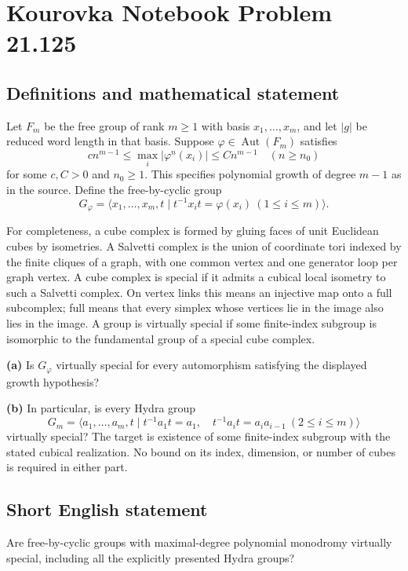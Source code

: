 \documentclass[11pt,a4paper]{article}
\begin{document}
\section*{Kourovka Notebook Problem 21.125}\label{statement}

\subsection{Definitions and mathematical statement}
Let $F_m$ be the free group of rank $m\ge1$ with basis $x_1,\ldots,x_m$, and let $|g|$ be reduced word length in that basis. Suppose $\varphi\in\operatorname{Aut}(F_m)$ satisfies
\[
 c n^{m-1}\le\max_i|\varphi^n(x_i)|\le C n^{m-1}
 \quad(n\ge n_0)
\]
for some $c,C>0$ and $n_0\ge1$. This specifies polynomial growth of degree $m-1$ as in the source. Define the free-by-cyclic group
\[
 G_\varphi=\langle x_1,\ldots,x_m,t\mid
 t^{-1}x_it=\varphi(x_i)\ (1\le i\le m)\rangle.
\]

For completeness, a cube complex is formed by gluing faces of unit Euclidean cubes by isometries. A Salvetti complex is the union of coordinate tori indexed by the finite cliques of a graph, with one common vertex and one generator loop per graph vertex. A cube complex is special if it admits a cubical local isometry to such a Salvetti complex. On vertex links this means an injective map onto a full subcomplex; full means that every simplex whose vertices lie in the image also lies in the image. A group is virtually special if some finite-index subgroup is isomorphic to the fundamental group of a special cube complex.

\textbf{(a)} Is $G_\varphi$ virtually special for every automorphism satisfying the displayed growth hypothesis?

\textbf{(b)} In particular, is every Hydra group
\[
 G_m=\langle a_1,\ldots,a_m,t\mid
 t^{-1}a_1t=a_1,\quad t^{-1}a_it=a_ia_{i-1}\ (2\le i\le m)\rangle
\]
virtually special? The target is existence of some finite-index subgroup with the stated cubical realization. No bound on its index, dimension, or number of cubes is required in either part.
\subsection{Short English statement}
Are free-by-cyclic groups with maximal-degree polynomial monodromy virtually special, including all the explicitly presented Hydra groups?
\end{document}
